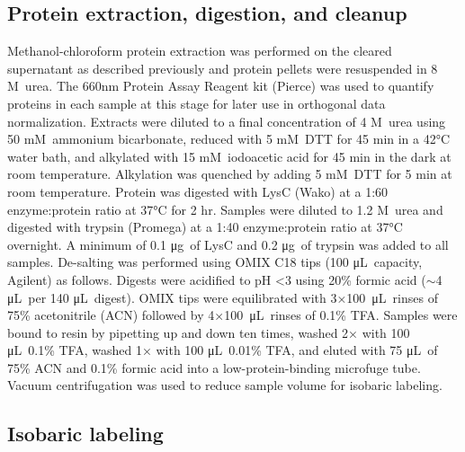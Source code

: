 \documentclass[11pt,letter]{article}\usepackage[]{graphicx}\usepackage[]{color}
\newcommand{\micro}{μ}
\newcommand{\milli}{m}
\newcommand{\gram}{g}
\newcommand{\liter}{L}
\newcommand{\molar}{\textsc{M}}
\newcommand{\celsius}[1]{#1°C}
\begin{document}
\subsection*{Protein extraction, digestion, and cleanup}

Methanol-chloroform protein extraction was performed on the cleared
supernatant as described previously \cite{minkoff_pipeline_2014} and protein
pellets were resuspended in 8 \molar\ urea. The 660nm Protein Assay Reagent
kit (Pierce) was used to quantify proteins in each sample at this stage for
later use in orthogonal data normalization. Extracts were diluted to a final
concentration of 4 \molar\ urea using 50 \milli\molar\ ammonium bicarbonate,
reduced with 5 \milli\molar\ DTT for 45 min in a \celsius{42} water bath, and
alkylated with 15 \milli\molar\ iodoacetic acid for 45 min in the dark at room
temperature. Alkylation was quenched by adding 5 \milli\molar\ DTT for 5 min
at room temperature. Protein was digested with LysC (Wako) at a 1:60
enzyme:protein ratio at \celsius{37} for 2 hr. Samples were diluted to 1.2
\molar\ urea and digested with trypsin (Promega) at a 1:40 enzyme:protein
ratio at \celsius{37} overnight. A minimum of 0.1 \micro\gram\ of LysC and 0.2
\micro\gram\ of trypsin was added to all samples. De-salting was performed
using OMIX C18 tips (100 \micro\liter\ capacity, Agilent) as follows. Digests
were acidified to pH <3 using 20\% formic acid ($\sim$4 \micro\liter\ per 140
\micro\liter\ digest). OMIX tips were equilibrated with 3×100\ \micro\liter\
rinses of 75\% acetonitrile (ACN) followed by 4×100\ \micro\liter\ rinses of
0.1\% TFA. Samples were bound to resin by pipetting up and down ten times,
washed 2× with 100 \micro\liter\ 0.1\% TFA, washed 1× with 100 \micro\liter\
0.01\% TFA, and eluted with 75 \micro\liter\ of 75\% ACN and 0.1\% formic acid
into a low-protein-binding microfuge tube. Vacuum centrifugation was used to
reduce sample volume for isobaric labeling.

\subsection*{Isobaric labeling}
\end{document}
